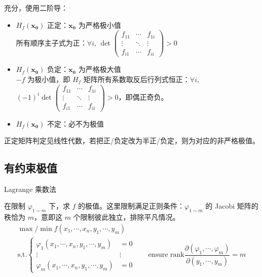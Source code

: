 \documentclass[12pt, a4paper, UTF8, openany]{ctexbook}
\newcommand{\mat}[1]{\mathbf{#1}}
\begin{document}
        充分，使用二阶导：
        \begin{itemize}
            \item $H_f(\mat{x_0})$ 正定：$\mat{x_0}$ 为严格极小值 \\
                所有顺序主子式为正：$\forall i$, $\det \begin{pmatrix}
                    f_{11} & \cdots & f_{1i} \\
                    \vdots & \ddots & \vdots \\
                    f_{i1} & \cdots & f_{ii}
                \end{pmatrix} > 0$
            \item $H_f(\mat{x_0})$ 负定：$\mat{x_0}$ 为严格极大值 \\
                $-f$ 为极小值，即 $H_f$ 矩阵所有系数取反后行列式恒正：$\forall i$, $(-1)^i \det \begin{pmatrix}
                    f_{11} & \cdots & f_{1i} \\
                    \vdots & \ddots & \vdots \\
                    f_{i1} & \cdots & f_{ii}
                \end{pmatrix} > 0$，即偶正奇负。
            \item $H_f(\mat{x_0})$ 不定：必不为极值
        \end{itemize}
        正定矩阵判定见线性代数，若把正/负定改为半正/负定，则为对应的非严格极值。

        \subsection{有约束极值}
        Lagrange 乘数法

        在限制 $\varphi_{1 \sim m}$ 下，求 $f$ 的极值。这里限制满足正则条件：$\varphi_{1 \sim m}$ 的 Jacobi 矩阵的秩恰为 $m$，意即这 $m$ 个限制彼此独立，排除平凡情况。
        $$\begin{matrix}
            \max/\min f(x_1, \cdots, x_n, y_1, \cdots, y_m) & \\
            \text{s.t.} \begin{cases}
                \varphi_1(x_1, \cdots, x_n, y_1, \cdots, y_m) &= 0 \\
                \vdots & \vdots \\
                \varphi_m(x_1, \cdots, x_n, y_1, \cdots, y_m) &= 0
            \end{cases} &
            \quad\text{ensure }\mathrm{rank} \dfrac{\partial (\varphi_1, \cdots, \varphi_m)}{\partial (y_1, \cdots, y_m)} = m
        \end{matrix}$$
\end{document}
